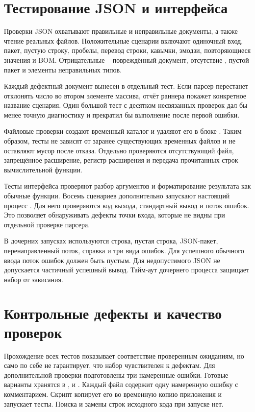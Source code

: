 \section{Тестирование JSON и интерфейса}
Проверки JSON охватывают правильные и неправильные документы, а также чтение реальных файлов. Положительные сценарии включают одиночный вход, пакет, пустую строку, пробелы, перевод строки, кавычки, эмодзи, повторяющиеся значения и BOM. Отрицательные -- повреждённый документ, отсутствие , пустой пакет и элементы неправильных типов.

Каждый дефектный документ вынесен в отдельный тест. Если парсер перестанет отклонять число во втором элементе массива, отчёт раннера покажет конкретное название сценария. Один большой тест с десятком несвязанных проверок дал бы менее точную диагностику и прекратил бы выполнение после первой ошибки.

Файловые проверки создают временный каталог и удаляют его в блоке . Таким образом, тесты не зависят от заранее существующих временных файлов и не оставляют мусор после отказа. Отдельно проверяются отсутствующий файл, запрещённое расширение, регистр расширения и передача прочитанных строк вычислительной функции.

Тесты интерфейса проверяют разбор аргументов и форматирование результата как обычные функции. Восемь сценариев дополнительно запускают настоящий процесс . Для него проверяются код выхода, стандартный вывод и поток ошибок. Это позволяет обнаруживать дефекты точки входа, которые не видны при отдельной проверке парсера.

В дочерних запусках используются строка, пустая строка, JSON-пакет, перенаправленный поток, справка и три вида ошибок. Для успешного обычного ввода поток ошибок должен быть пустым. Для недопустимого JSON не допускается частичный успешный вывод. Тайм-аут дочернего процесса защищает набор от зависания.

\section{Контрольные дефекты и качество проверок}
Прохождение всех тестов показывает соответствие проверенным ожиданиям, но само по себе не гарантирует, что набор чувствителен к дефектам. Для дополнительной проверки подготовлены три намеренные ошибки. Готовые варианты хранятся в ,  и . Каждый файл содержит одну намеренную ошибку с комментарием. Скрипт копирует его во временную копию приложения и запускает тесты. Поиска и замены строк исходного кода при запуске нет.


